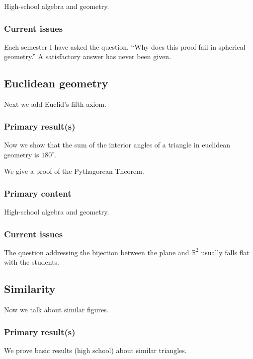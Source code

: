 \documentclass{amsart}
\newcommand{\RR}{\mathbb{R}}
\begin{document}
High-school algebra and geometry.


\subsubsection{Current issues}

Each semester I have asked the question, ``Why does this proof fail in
spherical geometry.'' A satisfactory answer has never been given.


\subsection{Euclidean geometry}

Next we add Euclid's fifth axiom.

\subsubsection{Primary result(s)}

Now we show that the sum of the interior angles of a triangle in
euclidean geometry is $180^\circ$.

We give a proof of the Pythagorean Theorem.

\subsubsection{Primary content}

High-school algebra and geometry. 

\subsubsection{Current issues}

The question addressing the bijection between the plane and $\RR^2$
usually falls flat with the students.



\subsection{Similarity}

Now we talk about similar figures.

\subsubsection{Primary result(s)}

We prove basic results (high school) about similar triangles.
\end{document}
